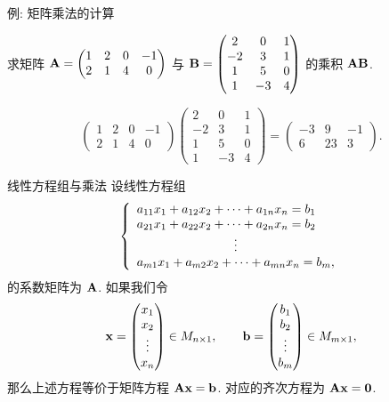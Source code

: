 \begin{frame}{例: 矩阵乘法的计算}
	\onslide<+->
	\begin{example}
		求矩阵 ${\mathbf{A}}=\begin{pmatrix}
			1&2&0&-1\\2&1&4&0
		\end{pmatrix}$ 与 ${\mathbf{B}}=\begin{pmatrix}
			2&0&1\\
			-2&3&1\\
			1&5&0\\
			1&-3&4
		\end{pmatrix}$ 的乘积 ${\mathbf{A}}{\mathbf{B}}$.
	\end{example}
	\onslide<+->
	\begin{solution}
		\[\begin{pmatrix}
			1&2&0&-1\\2&1&4&0
		\end{pmatrix}\begin{pmatrix}
			2&0&1\\
			-2&3&1\\
			1&5&0\\
			1&-3&4
		\end{pmatrix}=\begin{pmatrix}
			-3&9&-1\\
			6&23&3
		\end{pmatrix}.\]
	\end{solution}
\end{frame}


\begin{frame}{线性方程组与乘法}
	\onslide<+->
	设线性方程组
	\[\laeq{
		a_{11}x_1+a_{12}x_2+\cdots+a_{1n}x_n=b_1\\
		a_{21}x_1+a_{22}x_2+\cdots+a_{2n}x_n=b_2\\
		\vvdots\\
		a_{m1}x_1+a_{m2}x_2+\cdots+a_{mn}x_n=b_m,
	}\]
	的系数矩阵为 ${\mathbf{A}}$.
	\onslide<+->
	如果我们令
	\[{\mathbf{x}}=\begin{pmatrix}
		x_1\\x_2\\\vdots\\x_n
	\end{pmatrix}\in M_{n\times 1},\qquad
	{\mathbf{b}}=\begin{pmatrix}
		b_1\\b_2\\\vdots\\b_m
	\end{pmatrix}\in M_{m\times 1},\]
	\onslide<+->
	那么上述方程等价于矩阵方程 \alert{${\mathbf{A}}{\mathbf{x}}={\mathbf{b}}$}.
	\onslide<+->
	对应的齐次方程为 \alert{${\mathbf{A}}{\mathbf{x}}={\bf0}$}.
\end{frame}


